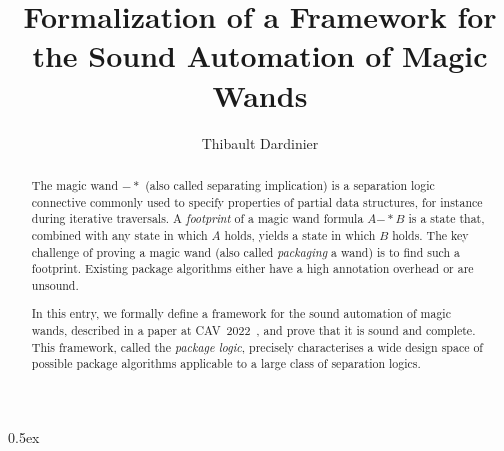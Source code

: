 \documentclass[11pt,a4paper]{article}
\newcommand{\wand}{\ensuremath{\mathbin{-\!\!*}}}
\begin{document}
\title{Formalization of a Framework for the Sound Automation of Magic Wands}
\author{Thibault Dardinier}
\maketitle

\begin{abstract}
The magic wand $\wand$ (also called separating implication) is a separation logic~\cite{Reynolds02a} connective %
commonly used to specify properties of partial data structures,
for instance during iterative traversals.
A \emph{footprint} of a magic wand formula $A \wand B$ is a state that, combined with any state in which $A$ holds, yields a state in which $B$ holds.
The key challenge of proving a magic wand (also called \emph{packaging} a wand) is to find such a footprint.
Existing package algorithms either have a high annotation overhead or are unsound.

In this entry, we formally define a framework for the sound automation of magic wands, described in a paper at CAV~2022~\cite{Dardinier22},
and prove that it is sound and complete.
This framework, called the \emph{package logic}, precisely characterises a wide design space of possible package algorithms applicable to a large class of separation logics.
\end{abstract}

\tableofcontents

\parindent 0pt\parskip 0.5ex





\end{document}

